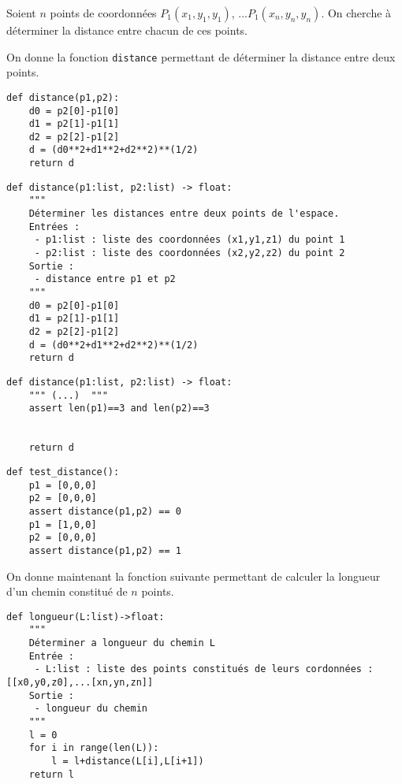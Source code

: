 
Soient $n$ points de coordonnées $P_1(x_1,y_1,y_1)$,  ...$P_1(x_n,y_n,y_n)$. On cherche à déterminer la distance entre chacun de ces points.

On donne la fonction \texttt{distance} permettant de déterminer la distance entre deux points. 

\begin{lstlisting}
def distance(p1,p2):
    d0 = p2[0]-p1[0]
    d1 = p2[1]-p1[1]
    d2 = p2[2]-p1[2]
    d = (d0**2+d1**2+d2**2)**(1/2)
    return d
\end{lstlisting}


\ifprof
\begin{lstlisting}
def distance(p1:list, p2:list) -> float:
    """
    Déterminer les distances entre deux points de l'espace. 
    Entrées : 
     - p1:list : liste des coordonnées (x1,y1,z1) du point 1
     - p2:list : liste des coordonnées (x2,y2,z2) du point 2
    Sortie :
     - distance entre p1 et p2
    """
    d0 = p2[0]-p1[0]
    d1 = p2[1]-p1[1]
    d2 = p2[2]-p1[2]
    d = (d0**2+d1**2+d2**2)**(1/2)
    return d
\end{lstlisting}
\else
\fi

\ifprof
\begin{lstlisting}
def distance(p1:list, p2:list) -> float:
    """ (...)  """
    assert len(p1)==3 and len(p2)==3

    
    return d
\end{lstlisting}

\else
\fi


\ifprof
\begin{lstlisting}
def test_distance():
    p1 = [0,0,0]
    p2 = [0,0,0]
    assert distance(p1,p2) == 0
    p1 = [1,0,0]
    p2 = [0,0,0]
    assert distance(p1,p2) == 1
\end{lstlisting}

\else
\fi

On donne maintenant la fonction suivante permettant de calculer la longueur d'un chemin constitué de $n$ points. 
\begin{lstlisting}
def longueur(L:list)->float:
    """
    Déterminer a longueur du chemin L
    Entrée : 
     - L:list : liste des points constitués de leurs cordonnées : [[x0,y0,z0],...[xn,yn,zn]]
    Sortie :
     - longueur du chemin
    """
    l = 0
    for i in range(len(L)):
        l = l+distance(L[i],L[i+1])
    return l
\end{lstlisting}

